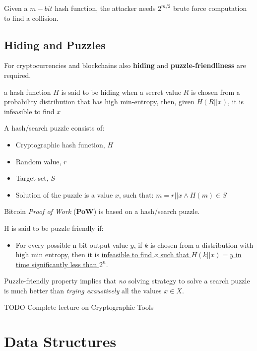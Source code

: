Given a $m-bit$ hash function, the attacker needs $2^{m/2}$ brute force computation to
find a collision.

\subsection{Hiding and Puzzles}
For cryptocurrencies and blockchains also \textbf{hiding} and \textbf{puzzle-friendliness} are required.
\begin{definition}[Hiding]
a hash function $H$ is said to be hiding when a secret value $R$ is chosen from
a probability distribution that has high min-entropy, then, given  $H(R || x)$, it is infeasible to find $x$
\end{definition}
\nl

A hash/search puzzle consists of:
\begin{itemize}
   \item Cryptographic hash function, $H$
   \item Random value, $r$
   \item Target set, $S$
   \item Solution of the puzzle is a value $x$, such that:
   $m = r || x \wedge H(m) \in S$
\end{itemize}
Bitcoin \textit{Proof of Work} (\textbf{PoW}) is based on a hash/search puzzle.
\begin{definition}
   H is said to be puzzle friendly if:
   \begin{itemize}
      \item For every possible n-bit output value $y$, if $k$ is chosen from a distribution with high min entropy, then it is \ul{infeasible to find $x$ such that $H(k || x) = y$ in time significantly less than $2^n$}.
   \end{itemize}
\end{definition}
Puzzle-friendly property implies that
\textit{no} solving strategy to solve a search puzzle is much better than \textit{trying exaustively} all the values $x \in X$.

TODO
Complete lecture on Cryptographic Tools

\section{Data Structures}

